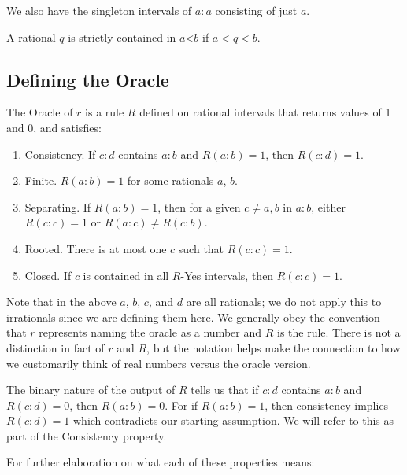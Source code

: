 \documentclass[12pt]{article}
\theoremstyle{remark}
\newcommand{\lt}{\mathord{<}}
\begin{document}
We also have the singleton intervals of $a:a$ consisting of just $a$. 

A rational $q$ is strictly contained in $a\lt b$ if $a < q < b$. 

\subsection{Defining the Oracle}

The Oracle of $r$ is a rule $R$ defined on rational intervals that returns values of 1 and 0, and satisfies: 
\begin{enumerate}
    \item Consistency. If $c:d$ contains $a:b$ and $R(a:b) = 1$, then $R(c:d) = 1$.
    \item Finite. $R(a:b) = 1$ for some rationals $a$, $b$.
    \item Separating. If $R(a:b)=1$, then for a given $c \neq a, b$ in $a:b$, either $R(c:c) = 1$ or $R(a:c) \neq R(c:b)$. 
    \item Rooted. There is at most one $c$ such that $R(c:c) =1$.
    \item Closed. If $c$ is contained in all $R$-Yes intervals, then $R(c:c) = 1$.
\end{enumerate}

Note that in the above $a$, $b$, $c$, and $d$ are all rationals; we do not apply this to irrationals since we are defining them here. We generally obey the convention that $r$ represents naming the oracle as a number and $R$ is the rule. There is not a distinction in fact of $r$ and $R$, but the notation helps make the connection to how we customarily think of real numbers versus the oracle version. 

The binary nature of the output of $R$ tells us that if $c:d$ contains $a:b$ and $R(c:d) = 0$, then $R(a:b) = 0$. For if $R(a:b)=1$, then consistency implies $R(c:d)=1$ which contradicts our starting assumption. We will refer to this as part of the Consistency property. 

For further elaboration on what each of these properties means:
\end{document}
